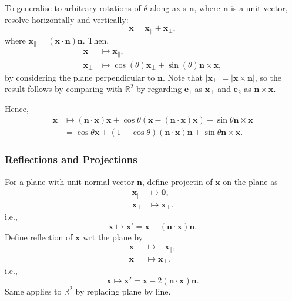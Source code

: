 \documentclass[a4paper]{article}
\begin{document}
To generalise to arbitrary rotations of $\theta $ along axis $
\mathbf{n} $, where $ \mathbf{n} $ is a unit vector, resolve
horizontally and vertically:
\[
  \mathbf{x}=\mathbf{x}_{\parallel}+\mathbf{x}_{\perp}
,\]
where $ \mathbf{x}_{\parallel}=(\mathbf{x}\cdot \mathbf{n})\mathbf{n} $.
Then,
\[
  \begin{aligned}
    \mathbf{x}_{\parallel}&\mapsto \mathbf{x}_{\parallel },\\
    \mathbf{x}_{\perp }&\mapsto \cos(\theta)\mathbf{x}_{\perp
    }+\sin(\theta)\mathbf{n}\times \mathbf{x},
  \end{aligned}
\]
by considering the plane perpendicular to $ \mathbf{n} $. Note that $
|\mathbf{x}_{\perp }|=|\mathbf{x}\times \mathbf{n}| $, so the result
follows by comparing with $ \mathbb{R}^{2} $ by regarding $
\mathbf{e}_1 $ as $ \mathbf{x}_{\perp } $ and $ \mathbf{e}_2 $ as $
\mathbf{n}\times \mathbf{x} $.

Hence,
\[
  \begin{aligned}
    \mathbf{x} &\mapsto (\mathbf{n}\cdot \mathbf{x})\mathbf{x}+\cos
    \theta (\mathbf{x}-(\mathbf{n}\cdot \mathbf{x})\mathbf{x})+\sin
    \theta \mathbf{n}\times \mathbf{x}\\
    &= \boxed{\cos \theta \mathbf{x}+(1-\cos \theta)(\mathbf{n}\cdot
    \mathbf{x})\mathbf{n}+\sin \theta \mathbf{n}\times \mathbf{x}.}
  \end{aligned}
\]
\subsubsection{Reflections and Projections}
For a plane with unit normal vector $ \mathbf{n} $, define projectin
of $ \mathbf{x} $ on the plane as
\[
  \begin{aligned}
    \mathbf{x}_{\parallel}& \mapsto \mathbf{0},\\
    \mathbf{x}_{\perp}& \mapsto \mathbf{x}_{\perp}.
  \end{aligned}
\]
i.e.,
\[
  \mathbf{x}\mapsto \mathbf{x}'=\mathbf{x}-(\mathbf{n}\cdot
  \mathbf{x})\mathbf{n}
.\]
Define reflection of $ \mathbf{x} $ wrt the plane by
\[
  \begin{aligned}
    \mathbf{x}_{\parallel}& \mapsto -\mathbf{x}_{\parallel},\\
    \mathbf{x}_{\perp}& \mapsto \mathbf{x}_{\perp}.
  \end{aligned}
\]
i.e.,
\[
  \mathbf{x} \mapsto \mathbf{x}'=\mathbf{x}-2(\mathbf{n}\cdot
  \mathbf{x})\mathbf{n}
.\]
Same applies to $ \mathbb{R}^{2} $ by replacing plane by line.
\end{document}
